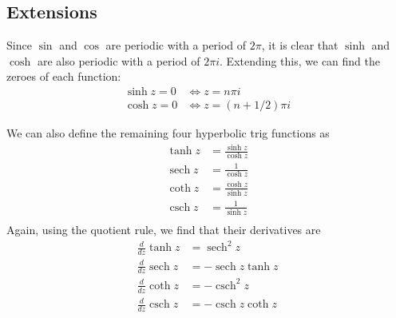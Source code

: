 \documentclass{article}
\DeclareMathOperator{\sech}{sech}
\DeclareMathOperator{\csch}{csch}
\begin{document}
\subsection{Extensions}
Since $\sin$ and $\cos$ are periodic with a period of $2\pi$, it is clear that $\sinh$ and $\cosh$ are also periodic with a period of $2\pi i$. Extending this, we can find the zeroes of each function:
\begin{align*}
	\sinh z = 0 &\iff z = n\pi i \\
	\cosh z = 0 &\iff z = (n + 1/2) \pi i
\end{align*}

We can also define the remaining four hyperbolic trig functions as
\begin{align*}
	\tanh z &= \frac{\sinh z}{\cosh z} \\
	\sech z &= \frac{1}{\cosh z} \\
	\coth z &= \frac{\cosh z}{\sinh z} \\
	\csch z &= \frac{1}{\sinh z} \\
\end{align*}
Again, using the quotient rule, we find that their derivatives are
\begin{align*}
	\frac{d}{dz} \tanh z &= \sech^2 z \\
	\frac{d}{dz} \sech z &= - \sech z \tanh z \\
	\frac{d}{dz} \coth z &= - \csch^2 z \\
	\frac{d}{dz} \csch z &= - \csch z \coth z
\end{align*}
\end{document}
